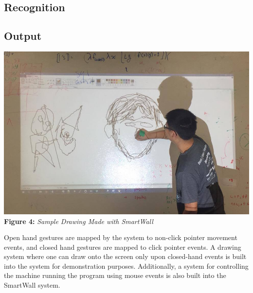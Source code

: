 \documentclass[twoside,twocolumn]{article}
\begin{document}
\subsection{Recognition}

\subsection{Output}

\begin{center}
	\includegraphics[scale=0.19]{sample} \\
	\vspace{0.25cm}
	\small{\textbf{Figure 4:} \textit{Sample Drawing Made with SmartWall}}
\end{center}

Open hand gestures are mapped by the system to non-click pointer movement events, and closed hand gestures are mapped to click pointer events. A drawing system where one can draw onto the screen only upon closed-hand events is built into the system for demonstration purposes. Additionally, a system for controlling the machine running the program using mouse events is also built into the SmartWall system.
\end{document}
